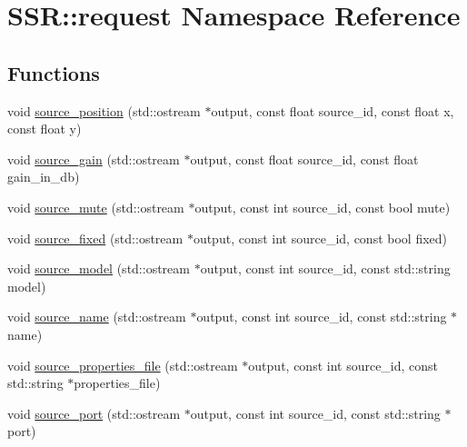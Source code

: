 \hypertarget{namespaceSSR_1_1request}{\section{S\-S\-R\-:\-:request Namespace Reference}
\label{namespaceSSR_1_1request}
}
\subsection*{Functions}
\begin{DoxyCompactItemize}
\item 
void \hyperlink{namespaceSSR_1_1request_ae279ccd2363c0366e0b6da3a156604de}{source\-\_\-position} (std\-::ostream $\ast$output, const float source\-\_\-id, const float x, const float y)
\item 
void \hyperlink{namespaceSSR_1_1request_ae74fe50dcd28b59a65a302493b94d689}{source\-\_\-gain} (std\-::ostream $\ast$output, const float source\-\_\-id, const float gain\-\_\-in\-\_\-db)
\item 
void \hyperlink{namespaceSSR_1_1request_adf834fe564574b466e558639ea46b499}{source\-\_\-mute} (std\-::ostream $\ast$output, const int source\-\_\-id, const bool mute)
\item 
void \hyperlink{namespaceSSR_1_1request_a18a96e931ab9839772bc687a905073ea}{source\-\_\-fixed} (std\-::ostream $\ast$output, const int source\-\_\-id, const bool fixed)
\item 
void \hyperlink{namespaceSSR_1_1request_ab54d0c73a1809fbd81bb8c63397a145c}{source\-\_\-model} (std\-::ostream $\ast$output, const int source\-\_\-id, const std\-::string model)
\item 
void \hyperlink{namespaceSSR_1_1request_a02e519f25618e37b02d961d0b484abe0}{source\-\_\-name} (std\-::ostream $\ast$output, const int source\-\_\-id, const std\-::string $\ast$name)
\item 
void \hyperlink{namespaceSSR_1_1request_a39eaeaa80a353d669fdca01c5b5ecc9a}{source\-\_\-properties\-\_\-file} (std\-::ostream $\ast$output, const int source\-\_\-id, const std\-::string $\ast$properties\-\_\-file)
\item 
void \hyperlink{namespaceSSR_1_1request_ac23a51a3ed4e1a3887d06d7c3bad2af4}{source\-\_\-port} (std\-::ostream $\ast$output, const int source\-\_\-id, const std\-::string $\ast$port)
\end{DoxyCompactItemize}



